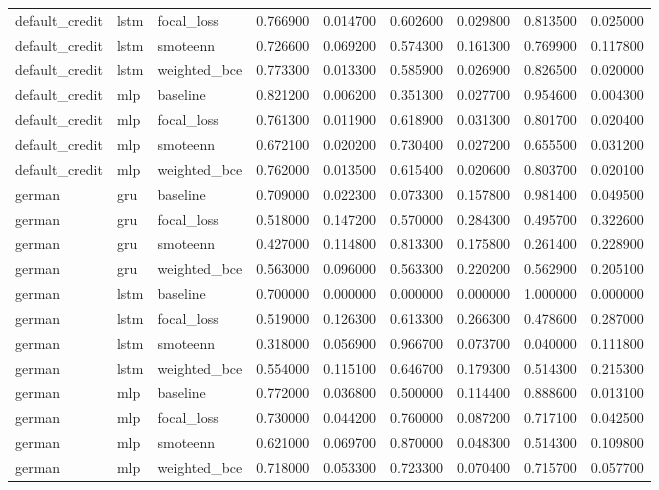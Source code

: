 \begin{tabular}{lllrrrrrr}
default_credit & lstm & focal_loss & 0.766900 & 0.014700 & 0.602600 & 0.029800 & 0.813500 & 0.025000 \\
default_credit & lstm & smoteenn & 0.726600 & 0.069200 & 0.574300 & 0.161300 & 0.769900 & 0.117800 \\
default_credit & lstm & weighted_bce & 0.773300 & 0.013300 & 0.585900 & 0.026900 & 0.826500 & 0.020000 \\
default_credit & mlp & baseline & 0.821200 & 0.006200 & 0.351300 & 0.027700 & 0.954600 & 0.004300 \\
default_credit & mlp & focal_loss & 0.761300 & 0.011900 & 0.618900 & 0.031300 & 0.801700 & 0.020400 \\
default_credit & mlp & smoteenn & 0.672100 & 0.020200 & 0.730400 & 0.027200 & 0.655500 & 0.031200 \\
default_credit & mlp & weighted_bce & 0.762000 & 0.013500 & 0.615400 & 0.020600 & 0.803700 & 0.020100 \\
german & gru & baseline & 0.709000 & 0.022300 & 0.073300 & 0.157800 & 0.981400 & 0.049500 \\
german & gru & focal_loss & 0.518000 & 0.147200 & 0.570000 & 0.284300 & 0.495700 & 0.322600 \\
german & gru & smoteenn & 0.427000 & 0.114800 & 0.813300 & 0.175800 & 0.261400 & 0.228900 \\
german & gru & weighted_bce & 0.563000 & 0.096000 & 0.563300 & 0.220200 & 0.562900 & 0.205100 \\
german & lstm & baseline & 0.700000 & 0.000000 & 0.000000 & 0.000000 & 1.000000 & 0.000000 \\
german & lstm & focal_loss & 0.519000 & 0.126300 & 0.613300 & 0.266300 & 0.478600 & 0.287000 \\
german & lstm & smoteenn & 0.318000 & 0.056900 & 0.966700 & 0.073700 & 0.040000 & 0.111800 \\
german & lstm & weighted_bce & 0.554000 & 0.115100 & 0.646700 & 0.179300 & 0.514300 & 0.215300 \\
german & mlp & baseline & 0.772000 & 0.036800 & 0.500000 & 0.114400 & 0.888600 & 0.013100 \\
german & mlp & focal_loss & 0.730000 & 0.044200 & 0.760000 & 0.087200 & 0.717100 & 0.042500 \\
german & mlp & smoteenn & 0.621000 & 0.069700 & 0.870000 & 0.048300 & 0.514300 & 0.109800 \\
german & mlp & weighted_bce & 0.718000 & 0.053300 & 0.723300 & 0.070400 & 0.715700 & 0.057700 \\
\bottomrule
\end{tabular}
